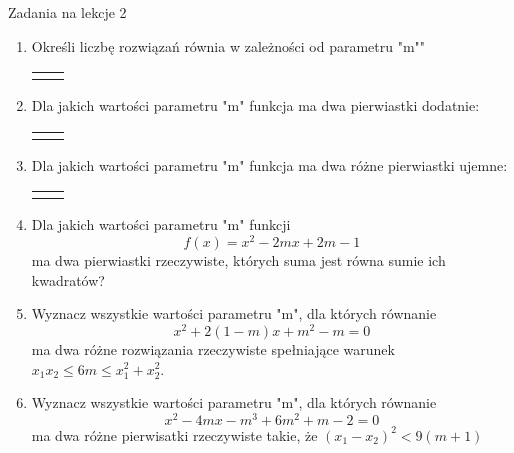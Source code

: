 \documentclass[12pt,a4paper]{article}
\begin{document}
	
	\begin{center}
		\LARGE Zadania na lekcje 2
	\end{center}
	\vspace{1.5cm}
	
	\begin{enumerate}[1.]
		\item Określi liczbę rozwiązań równia w zależności od parametru "m""
		\begin{enumerate}[a)] \begin{tabular}{p{7cm} p{7cm}} 
				\item $(m-3)x^2+(m-2)x+1=0$& \vspace{0.4cm} 	\item $(2m-3)x^2+4mx+m-1=0$ \\
		\end{tabular} \end{enumerate}
	
		\item Dla jakich wartości parametru "m" funkcja ma dwa pierwiastki dodatnie:
		\begin{enumerate}[a)] \begin{tabular}{p{7cm} p{7cm}} 
				\item $f(x)=x^2+2(m-1)x+2m+1$& \vspace{0.4cm} 	\item $f(x)=x^2+(m-5)x+m-2$ \\
		\end{tabular} \end{enumerate}
	
		\item Dla jakich wartości parametru "m" funkcja ma dwa różne pierwiastki ujemne:
		\begin{enumerate}[a)] \begin{tabular}{p{7cm} p{7cm}} 
				\item $f(x)=x^2+5mx+4m^2-3m$& \vspace{0.4cm} 	\item $f(x)=(m-2)x^2-2mx+m^2-3m+4$ \\
		\end{tabular} \end{enumerate}
	
		\item Dla jakich wartości parametru "m" funkcji
		$$f(x)=x^2-2mx+2m-1$$
		ma dwa pierwiastki rzeczywiste, których suma jest równa sumie ich kwadratów?
		
		\item Wyznacz wszystkie wartości parametru "m", dla których równanie
		$$x^2+2(1-m)x+m^2-m=0$$
		ma dwa różne rozwiązania rzeczywiste spełniające warunek $x_1x_2\leq 6m \leq x_1^2+x_2^2 $.
		
		\item Wyznacz wszystkie wartości parametru "m", dla których równanie
		$$x^2-4mx-m^3+6m^2+m-2=0$$
		ma dwa różne pierwisatki rzeczywiste takie, że $(x_1-x_2)^2<9(m+1)$
	\end{enumerate}
	
\end{document}
